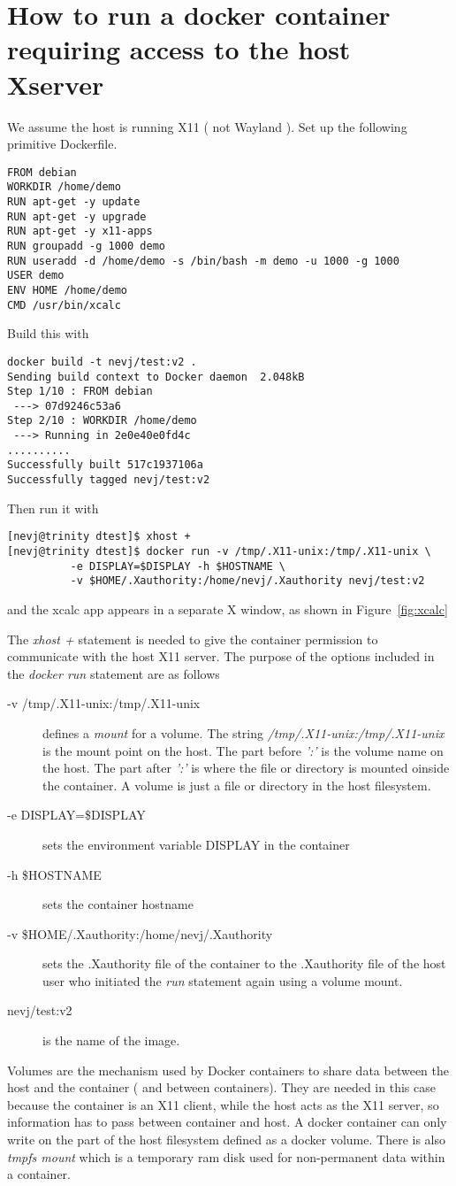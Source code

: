 \documentclass{article}  %
\begin{document}
\section{How to run a docker container requiring access to the host Xserver}
We assume the host is running X11 ( not Wayland ). Set up the following primitive Dockerfile.
\begin{verbatim}
FROM debian
WORKDIR /home/demo
RUN apt-get -y update
RUN apt-get -y upgrade
RUN apt-get -y x11-apps
RUN groupadd -g 1000 demo
RUN useradd -d /home/demo -s /bin/bash -m demo -u 1000 -g 1000
USER demo
ENV HOME /home/demo
CMD /usr/bin/xcalc
\end{verbatim}
 Build this with 
\begin{verbatim}
docker build -t nevj/test:v2 .
Sending build context to Docker daemon  2.048kB
Step 1/10 : FROM debian
 ---> 07d9246c53a6
Step 2/10 : WORKDIR /home/demo
 ---> Running in 2e0e40e0fd4c
..........
Successfully built 517c1937106a
Successfully tagged nevj/test:v2
\end{verbatim}
 Then run it with
\begin{verbatim}
[nevj@trinity dtest]$ xhost +
[nevj@trinity dtest]$ docker run -v /tmp/.X11-unix:/tmp/.X11-unix \
          -e DISPLAY=$DISPLAY -h $HOSTNAME \
          -v $HOME/.Xauthority:/home/nevj/.Xauthority nevj/test:v2
\end{verbatim}
and the xcalc app appears in a separate X window, as shown in Figure~\ref{fig:xcalc}

The {\em xhost +} statement is needed to give the container permission to communicate with the host X11 server. 
 The purpose of the options included in the {\em docker run} statement are as follows
\begin{description}
\item[-v /tmp/.X11-unix:/tmp/.X11-unix] defines a {\em mount} for a volume. The string {\em /tmp/.X11-unix:/tmp/.X11-unix} is the mount point on the host. The part before {\em ':'} is the volume name on the host. The part after {\em ':'} is where the file or directory is mounted oinside the container. A volume is just a file or directory in the host filesystem.
\item[-e DISPLAY=\$DISPLAY] sets the environment variable DISPLAY in the container
\item[-h \$HOSTNAME] sets the container hostname
\item[-v \$HOME/.Xauthority:/home/nevj/.Xauthority] sets the .Xauthority file of the container to the .Xauthority file of the host user who initiated the {\em run} statement again using a volume mount.
\item[nevj/test:v2] is the name of the image.
\end{description}
Volumes are the mechanism used by Docker containers to share data between the host and the container ( and between containers). They are needed in this case because the container is an X11 client, while the host acts as the X11 server, so information has to pass between container and host.  A docker container can only write on the part of the host filesystem defined as a docker volume. There is also {\em tmpfs mount} which is a temporary ram disk used for non-permanent data within a container.
\end{document}
